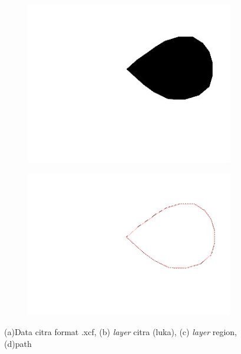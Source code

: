 \begin{figure}[H]
\begin{subfigure}{0.2\textwidth}
		\caption{}
	  \end{subfigure}  
	  \begin{subfigure}{0.2\textwidth}
		\centering{}
		\includegraphics[width=\textwidth]{gambar/gambar-3_2(c).jpg}
		\caption{}
	  \end{subfigure}
	  \begin{subfigure}{0.2\textwidth}
		\centering{}
		\includegraphics[width=\textwidth]{gambar/gambar-3_2(d).png}
		\caption{}
	  \end{subfigure}  
	\caption{
		(a)Data citra format .xcf, (b) \emph{layer} citra (luka), (c) \emph{layer} 
		region, (d)path
	 }
    \label{img:dataset_persiapan}
  \end{figure}

